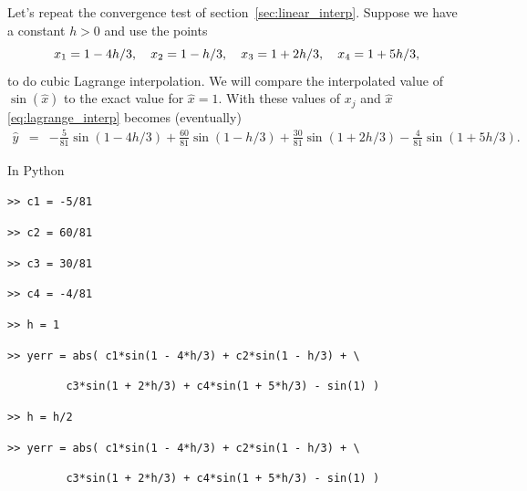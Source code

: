 Let's repeat the convergence test of section~\ref{sec:linear_interp}. Suppose we have a constant $h>0$ and use
the points
%
\begin{equation}
x_1 = 1 - 4h/3, \quad
x_2 = 1 - h/3, \quad
x_3 = 1 + 2h/3, \quad
x_4 = 1 + 5h/3, \notag
\end{equation}
%
to do cubic Lagrange interpolation. We will compare the interpolated value of
$\sin(\hat{x})$ to the exact value for $\hat{x} = 1$. With these values of $x_j$ and $\hat{x}$
\eqref{eq:lagrange_interp} becomes (eventually)
%
\begin{eqnarray}
\hat{y} & = & - \frac{5}{81} \sin(1 - 4h/3) + \frac{60}{81} \sin(1 - h/3)
\nonumber 
         + \frac{30}{81} \sin(1 + 2h/3) - \frac{4}{81} \sin(1 + 5h/3) .
\nonumber
\end{eqnarray}

\noindent
In Python


\noindent
\texttt{>> c1 = -5/81}

\noindent
\texttt{>> c2 = 60/81}

\noindent
\texttt{>> c3 = 30/81}

\noindent
\texttt{>> c4 = -4/81}

\noindent
\texttt{>> h = 1}

\noindent
\texttt{>> yerr = abs( c1*sin(1 - 4*h/3) + c2*sin(1 - h/3) + \textbackslash}

\noindent
\texttt{\ \ \ \ \ \ \ \ \ c3*sin(1 + 2*h/3) + c4*sin(1 + 5*h/3) - sin(1) )}

\noindent
\texttt{>> h = h/2}%



\noindent
\texttt{>> yerr = abs( c1*sin(1 - 4*h/3) + c2*sin(1 - h/3) + \textbackslash}

\noindent
\texttt{\ \ \ \ \ \ \ \ \ c3*sin(1 + 2*h/3) + c4*sin(1 + 5*h/3) - sin(1) )}

